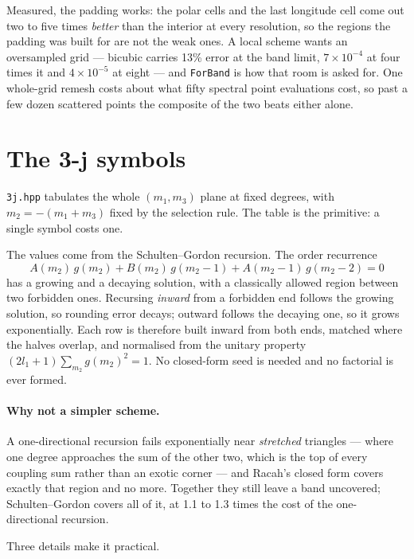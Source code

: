 \documentclass[11pt,a4paper]{article}
\newcommand{\code}[1]{\texttt{#1}}
\begin{document}
Measured, the padding works: the polar cells and the last longitude cell come
out two to five times \emph{better} than the interior at every resolution, so
the regions the padding was built for are not the weak ones.  A local scheme
wants an oversampled grid --- bicubic carries 13\% error at the band limit,
$7\times10^{-4}$ at four times it and $4\times10^{-5}$ at eight --- and
\code{ForBand} is how that room is asked for.  One whole-grid remesh costs
about what fifty spectral point evaluations cost, so past a few dozen
scattered points the composite of the two beats either alone.

\section{The 3-j symbols}
\label{sec:threej}

\code{3j.hpp} tabulates the whole $(m_1,m_3)$ plane at fixed degrees, with
$m_2=-(m_1+m_3)$ fixed by the selection rule.  The table is the primitive: a
single symbol costs one.

The values come from the Schulten--Gordon recursion.  The order recurrence
\begin{equation}
  A(m_2)\,g(m_2) + B(m_2)\,g(m_2-1) + A(m_2-1)\,g(m_2-2) = 0
  \label{eq:threejrec}
\end{equation}
has a growing and a decaying solution, with a classically allowed region
between two forbidden ones.  Recursing \emph{inward} from a forbidden end
follows the growing solution, so rounding error decays; outward follows the
decaying one, so it grows exponentially.  Each row is therefore built inward
from both ends, matched where the halves overlap, and normalised from the
unitary property $(2l_1+1)\sum_{m_2} g(m_2)^2 = 1$.  No closed-form seed is
needed and no factorial is ever formed.

\paragraph{Why not a simpler scheme.}  A one-directional recursion fails
exponentially near \emph{stretched} triangles --- where one degree
approaches the sum of the other two, which is the top of every coupling
sum rather than an exotic corner --- and Racah's closed form covers exactly
that region and no more.  Together they still leave a band uncovered;
Schulten--Gordon covers all of it, at 1.1 to 1.3 times the cost of the
one-directional recursion.

Three details make it practical.
\end{document}
